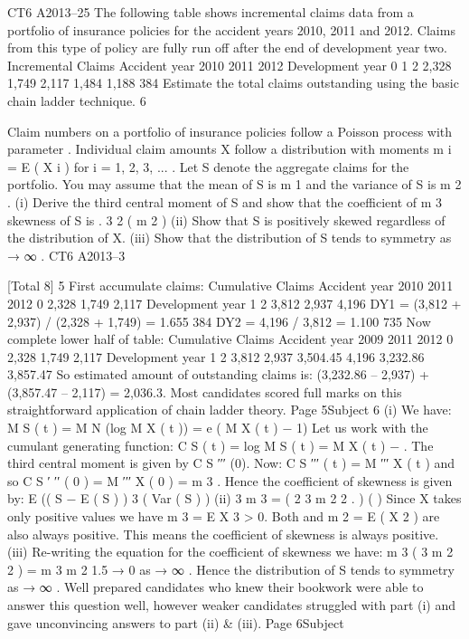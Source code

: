 CT6 A2013–25
The following table shows incremental claims data from a portfolio of insurance
policies for the accident years 2010, 2011 and 2012. Claims from this type of policy
are fully run off after the end of development year two.
Incremental
Claims
Accident year
2010
2011
2012
Development year
0
1
2
2,328
1,749
2,117
1,484
1,188
384
Estimate the total claims outstanding using the basic chain ladder technique.
6

Claim numbers on a portfolio of insurance policies follow a Poisson process with
parameter \lambda . Individual claim amounts X follow a distribution with moments
m i = E ( X i ) for i = 1, 2, 3, ... . Let S denote the aggregate claims for the portfolio.
You may assume that the mean of S is \lambda m 1 and the variance of S is \lambda m 2 .
(i)
Derive the third central moment of S and show that the coefficient of
\lambda m 3
skewness of S is
.
3
2
( \lambda m 2 ) 
(ii) Show that S is positively skewed regardless of the distribution of X. 
(iii) Show that the distribution of S tends to symmetry as \lambda → ∞ .
CT6 A2013–3

[Total 8]
5
First accumulate claims:
Cumulative
Claims
Accident year
2010
2011
2012
0
2,328
1,749
2,117
Development year
1
2
3,812
2,937
4,196
DY1 = (3,812 + 2,937) / (2,328 + 1,749) = 1.655 384
DY2 = 4,196 / 3,812 = 1.100 735
Now complete lower half of table:
Cumulative
Claims
Accident year
2009
2011
2012
0
2,328
1,749
2,117
Development year
1
2
3,812
2,937
3,504.45
4,196
3,232.86
3,857.47
So estimated amount of outstanding claims is:
(3,232.86 – 2,937) + (3,857.47 – 2,117) = 2,036.3.
Most candidates scored full marks on this straightforward application of chain ladder theory.
Page 5Subject %
6
(i)
We have:
M S ( t ) = M N (log M X ( t )) = e
\lambda ( M X ( t ) − 1)
Let us work with the cumulant generating function:
C S ( t ) = log M S ( t ) = \lambda M X ( t ) − \lambda .
The third central moment is given by C S ′′′ (0).
Now:
C S ′′′ ( t ) = \lambda M ′′′ X ( t )
and so
C S ′ ′′ ( 0 ) = \lambda M ′′′ X ( 0 ) = \lambda m 3 .
Hence the coefficient of skewness is given by:
E (( S − E ( S ) ) 3
( Var ( S ) )
(ii)
3
\lambda m 3
=
(
2
3
\lambda m 2 2
.
)
( )
Since X takes only positive values we have m 3 = E X 3 > 0.
Both \lambda and m 2 = E ( X 2 ) are also always positive.
This means the coefficient of skewness is always positive.
(iii)
Re-writing the equation for the coefficient of skewness we have:
\lambda m 3
(
3
\lambda m 2 2
)
=
m 3
m 2 1.5
→ 0 as \lambda → ∞ .
Hence the distribution of S tends to symmetry as \lambda → ∞ .
Well prepared candidates who knew their bookwork were able to answer this question well,
however weaker candidates struggled with part (i) and gave unconvincing answers to part
(ii) & (iii).
Page 6Subject %
